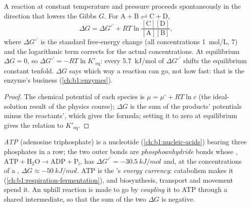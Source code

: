 \begin{proposition}\label{prop:b1:water-small-molecules:gibbs}
A reaction at constant temperature and pressure proceeds spontaneously
in the direction that lowers the Gibbs  $G$. For
$\mathrm{A} + \mathrm{B} \rightleftharpoons \mathrm{C} + \mathrm{D}$,
\[
\Delta G = \Delta G^{\circ\prime} + RT\ln\frac{[\mathrm{C}][\mathrm{D}]}{[\mathrm{A}][\mathrm{B}]},
\]
where $\Delta G^{\circ\prime}$ is the standard free-energy change
(all concentrations \qty{1}{mol/L},  7) and the logarithmic term
corrects for the actual concentrations. At equilibrium $\Delta G = 0$,
so $\Delta G^{\circ\prime} = -RT\ln K'_{\text{eq}}$: every
\qty{5.7}{kJ/mol} of $\Delta G^{\circ\prime}$ shifts the equilibrium
constant tenfold. $\Delta G$ says which way a reaction can go, not how
fast: that is the enzyme's business (\cref{ch:b1:enzymes}).
\end{proposition}
\begin{proof}
The chemical potential of each species is $\mu = \mu^\circ + RT\ln c$
(the ideal-solution result of the physics course); $\Delta G$ is the
sum of the products' potentials minus the reactants', which gives the
formula; setting it to zero at equilibrium gives the relation to
$K'_{\text{eq}}$.
\end{proof}

\begin{definition}\label{def:b1:water-small-molecules:atp}
\emph{ATP} (adenosine triphosphate) is a nucleotide
(\cref{ch:b1:nucleic-acids}) bearing three phosphates in a row; the two
outer bonds are \emph{phosphoanhydride}
bonds whose , $\mathrm{ATP} + \mathrm{H_2O} \to \mathrm{ADP} +
\mathrm{P_i}$, has $\Delta G^{\circ\prime} = \qty{-30.5}{kJ/mol}$ and,
at the concentrations of a , $\Delta G \approx \qty{-50}{kJ/mol}$.
ATP is the 's \emph{energy currency}:
catabolism makes it (\cref{ch:b1:respiration-fermentation}), and
biosynthesis, transport and movement spend it. An uphill reaction is
made to go by \emph{coupling} it to ATP
 through a shared intermediate, so that the sum of the two
$\Delta G$ is negative.
\end{definition}

